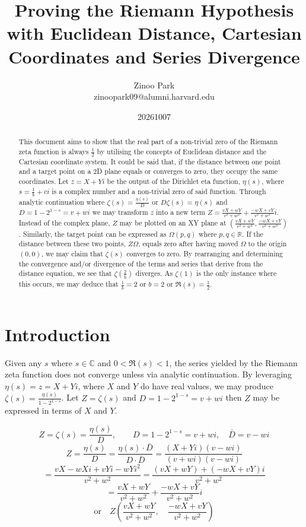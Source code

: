 \documentclass{amsart}
\title[RH Euclidean Cartesian]{Proving the Riemann Hypothesis \\
	with Euclidean Distance, Cartesian Coordinates and Series Divergence}
\author{Zinoo Park  \\ \MakeLowercase{zinoopark09@alumni.harvard.edu}}
\date{20261007}
\begin{document}
	\maketitle
	
	\begin{abstract}
		This document aims to show that the real part of a non-trivial zero of the Riemann zeta function is always $\frac12$ by utilising the concepts of Euclidean distance and the Cartesian coordinate system. It could be said that, if the distance between one point and a target point on a 2D plane equals or converges to zero, they occupy the same coordinates. Let $z=X+Yi$ be the output of the Dirichlet eta function, $\eta(s)$, where $s=\frac{1}{b} + ci$ is a complex number and a non-trivial zero of said function. Through analytic continuation where $\zeta(s) = \frac{\eta(s)}{D}$ or $D\zeta(s) = \eta(s)$ and $D=1-2^{1-s}=v+wi$ we may transform $z$ into a new term $Z = \frac{vX+wY}{v^2+w^2} + \frac{-wX+vY}{v^2+w^2}i$. Instead of the complex plane, $Z$ may be plotted on an XY plane at $(\frac{vX+wY}{v^2+w^2}, \frac{-wX+vY}{v^2+w^2})$. Similarly, the target point can be expressed as $\Omega(p, q)$ where $p, q \in \mathbb{R}$. If the distance between these two points, $Z\Omega$, equals zero after having moved $\Omega$ to the origin $(0,0)$, we may claim that $\zeta(s)$ converges to zero. By rearranging and determining the convergence and/or divergence of the terms and series that derive from the distance equation, we see that $\zeta(\frac{2}{b})$ diverges. As $\zeta(1)$ is the only instance where this occurs, we may deduce that $\frac{1}{b}=2$ or $b=2$ or $\Re(s)=\frac{1}{2}$.
	\end{abstract}
	
	\section{Introduction}
	Given any $s$ where $s \in \mathbb{C}$ and $0<\Re(s)<1$, the series yielded by the Riemann zeta function does not converge unless via analytic continuation. By leveraging $\eta(s) = z = X+Yi$, where $X$ and $Y$ do have real values, we may produce $\zeta(s) = \frac{\eta(s)}{1-2^{1-s}}$. Let $Z = \zeta(s)$ and $D = 1-2^{1-s} = v + wi$ then $Z$ may be expressed in terms of $X$ and $Y$.
	
	\[ Z = \zeta(s) = \frac{\eta(s)}{D}, \qquad D = 1-2^{1-s} = v + wi, \quad \bar{D} = v - wi \]
	\[ Z = \frac{\eta(s)}{D} = \frac{\eta(s) \cdot \bar{D}}{D \cdot \bar{D}} = \frac{(X+Yi)(v-wi)}{(v+wi)(v-wi)} \]
	\[ = \frac{vX-wXi+vYi-wYi^2}{v^2+w^2} = \frac{(vX+wY)+(-wX+vY)i}{v^2+w^2} \]
	\[ = \frac{vX+wY}{v^2+w^2} + \frac{-wX+vY}{v^2+w^2}i \]
	\[ \text{or} \quad Z(\frac{vX+wY}{v^2+w^2}, \quad \frac{-wX+vY}{v^2+w^2}) \]
	
\end{document}
